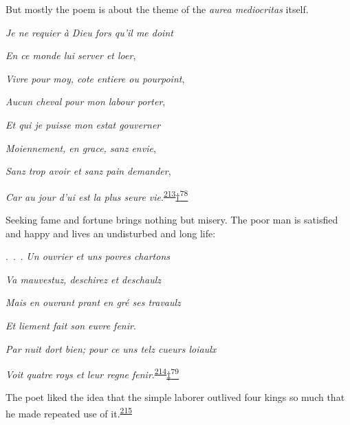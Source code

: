 But mostly the poem is about the theme of the \emph{aurea mediocritas}
itself.

\emph{Je ne requier à Dieu fors qu'il me doint}

\emph{En ce monde lui server et loer},

\emph{Vivre pour moy, cote entiere ou pourpoint},

\emph{Aucun cheval pour mon labour porter},

\emph{Et qui je puisse mon estat gouverner}

\emph{Moiennement, en grace, sanz envie},

\emph{Sanz trop avoir et sanz pain demander},

\emph{Car au jour d'ui est la plus seure
vie}.\textsuperscript{\protect\hypertarget{10_Chapter_Three__THE_HEROIC_DREAM.xhtmlux5cux23id_1511}{\protect\hyperlink{23_NOTES.xhtmlux5cux23id_1512}{213}}}\protect\hypertarget{10_Chapter_Three__THE_HEROIC_DREAM.xhtmlux5cux23id_3095}{\protect\hyperlink{23_NOTES.xhtmlux5cux23id_3096}{†\textsuperscript{78}}}

Seeking fame and fortune brings nothing but misery. The poor man is
satisfied and happy and lives an undisturbed and long life:

.~.~. \emph{Un ouvrier et uns povres chartons}

\emph{Va mauvestuz, deschirez et deschaulz}

\emph{Mais en ouvrant prant en gré ses travaulz}

\emph{Et liement fait son euvre fenir}.

\emph{Par nuit dort bien; pour ce uns telz cueurs loiaulx}

\emph{Voit quatre roys et leur regne
fenir}.\textsuperscript{\protect\hypertarget{10_Chapter_Three__THE_HEROIC_DREAM.xhtmlux5cux23id_1509}{\protect\hyperlink{23_NOTES.xhtmlux5cux23id_1510}{214}}}\protect\hypertarget{10_Chapter_Three__THE_HEROIC_DREAM.xhtmlux5cux23id_3097}{\protect\hyperlink{23_NOTES.xhtmlux5cux23id_3098}{‡\textsuperscript{79}}}

\protect\hypertarget{10_Chapter_Three__THE_HEROIC_DREAM.xhtmlux5cux23page_124}{}{}The
poet liked the idea that the simple laborer outlived four kings so much
that he made repeated use of
it.\textsuperscript{\protect\hypertarget{10_Chapter_Three__THE_HEROIC_DREAM.xhtmlux5cux23id_1507}{\protect\hyperlink{23_NOTES.xhtmlux5cux23id_1508}{215}}}


